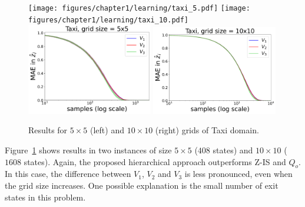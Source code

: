 \begin{figure}[!h]
\centering
\texttt{[image: figures/chapter1/learning/taxi\_5.pdf]}
\texttt{[image: figures/chapter1/learning/taxi\_10.pdf]}
\includegraphics[width=0.49\textwidth]{figures/chapter1/subtasks/taxi_5_subtasks.pdf}
\includegraphics[width=0.49\textwidth]{figures/chapter1/subtasks/taxi_10_subtasks.pdf}
\caption{Results for $5 \times 5$ (left) and $10 \times 10$ (right) grids of Taxi domain.}
\label{fig:hlmdps_errors_taxi}
\end{figure}


Figure~\ref{fig:hlmdps_errors_taxi} shows results in two instances of size $5 \times 5$ ($408$ states) and $10 \times 10$ ($1608$ states). %
Again, the proposed hierarchical approach outperforms Z-IS and $Q_o$.
In this case, the difference between $V_1$, $V_2$ and $V_3$ is less pronounced, even when the grid size increases. One possible explanation is the small number of exit states in this problem.

